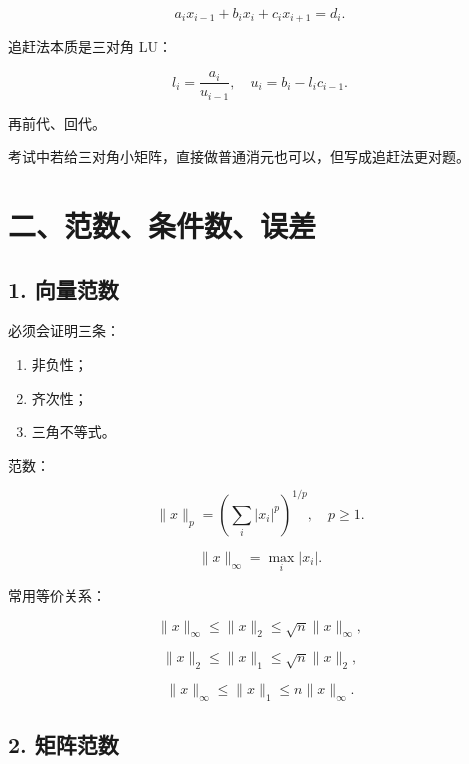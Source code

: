 \documentclass[11pt,a4paper]{ctexart}
\newcommand{\code}[1]{\begingroup\ttfamily\small #1\endgroup}
\begin{document}
\[
a_i x_{i-1}+b_i x_i+c_i x_{i+1}=d_i.
\]

追赶法本质是三对角 LU：

\[
l_i=\frac{a_i}{u_{i-1}},\quad u_i=b_i-l_i c_{i-1}.
\]

再前代、回代。

考试中若给三对角小矩阵，直接做普通消元也可以，但写成追赶法更对题。


\section*{二、范数、条件数、误差}



\subsection*{1. 向量范数}


必须会证明三条：

\begin{enumerate}

\item 非负性；

\item 齐次性；

\item 三角不等式。

\end{enumerate}

\code{} 范数：

\[
\|x\|_p=\left(\sum_i |x_i|^p\right)^{1/p},\quad p\ge 1.
\]

\[
\|x\|_\infty=\max_i |x_i|.
\]

常用等价关系：

\[
\|x\|_\infty \le \|x\|_2 \le \sqrt n\|x\|_\infty,
\]

\[
\|x\|_2 \le \|x\|_1 \le \sqrt n\|x\|_2,
\]

\[
\|x\|_\infty \le \|x\|_1 \le n\|x\|_\infty.
\]


\subsection*{2. 矩阵范数}

\end{document}
